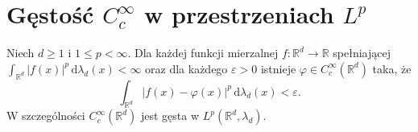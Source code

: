\section{Gęstość \texorpdfstring{$C_c^\infty$}{C\string_c\string^∞} w przestrzeniach \texorpdfstring{$L^p$}{L\string^p}}

\begin{twierdzenie}
\label{thm:cc-in-lp-10}
Niech $d\ge1$ i $1\le p<\infty$.
Dla każdej funkcji mierzalnej
$f:\mathbb R^d\to\mathbb R$ spełniającej
$\int_{\mathbb R^d}|f(x)|^p\,\mathrm d\lambda_d(x)
<\infty$ oraz dla każdego $\varepsilon>0$
istnieje $\varphi\in C_c^\infty(\mathbb R^d)$ taka, że
\begin{equation}\label{eq:lp-smooth-dense-10}
\int_{\mathbb R^d}|f(x)-\varphi(x)|^p
\,\mathrm d\lambda_d(x)<\varepsilon.
\end{equation}
W szczególności $C_c^\infty(\mathbb R^d)$ jest
gęsta w $L^p(\mathbb R^d,\lambda_d)$.
\end{twierdzenie}
